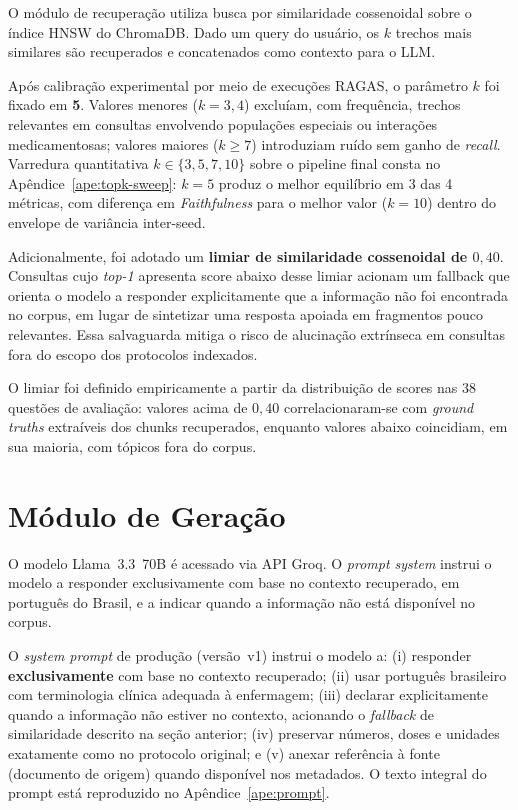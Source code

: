 \documentclass[
  12pt,
  oneside,
  a4paper,
  english,
  brazil
]{abntex2}
\begin{document}
O módulo de recuperação utiliza busca por similaridade cossenoidal sobre o índice
HNSW do ChromaDB. Dado um query do usuário, os $k$ trechos mais similares
são recuperados e concatenados como contexto para o LLM.

Após calibração experimental por meio de execuções RAGAS, o parâmetro $k$ foi
fixado em \textbf{5}. Valores menores ($k=3, 4$) excluíam, com frequência,
trechos relevantes em consultas envolvendo populações especiais ou interações
medicamentosas; valores maiores ($k \geq 7$) introduziam ruído sem ganho de
\textit{recall}. Varredura quantitativa $k \in \{3, 5, 7, 10\}$ sobre o
pipeline final consta no Apêndice~\ref{ape:topk-sweep}: $k=5$ produz o melhor
equilíbrio em 3 das 4 métricas, com diferença em \textit{Faithfulness} para o
melhor valor ($k=10$) dentro do envelope de variância inter-seed.

Adicionalmente, foi adotado um \textbf{limiar de similaridade cossenoidal de
$0{,}40$}. Consultas cujo \textit{top-1} apresenta score abaixo desse
limiar acionam um fallback que orienta o modelo a responder
explicitamente que a informação não foi encontrada no corpus, em lugar de
sintetizar uma resposta apoiada em fragmentos pouco relevantes. Essa salvaguarda
mitiga o risco de alucinação extrínseca em consultas fora do escopo dos
protocolos indexados.

O limiar foi definido empiricamente a partir da distribuição de scores
nas 38 questões de avaliação: valores acima de $0{,}40$ correlacionaram-se com
\textit{ground truths} extraíveis dos chunks recuperados, enquanto
valores abaixo coincidiam, em sua maioria, com tópicos fora do corpus.

\section{Módulo de Geração}

O modelo Llama~3.3~70B \cite{dubey2024} é acessado via API Groq. O \textit{prompt
system} instrui o modelo a responder exclusivamente com base no contexto recuperado,
em português do Brasil, e a indicar quando a informação não está disponível no
corpus.

O \textit{system prompt} de produção (versão~v1) instrui o modelo a: (i)
responder \textbf{exclusivamente} com base no contexto recuperado; (ii) usar
português brasileiro com terminologia clínica adequada à enfermagem; (iii)
declarar explicitamente quando a informação não estiver no contexto,
acionando o \textit{fallback} de similaridade descrito na seção anterior;
(iv) preservar números, doses e unidades exatamente como no protocolo
original; e (v) anexar referência à fonte (documento de origem) quando
disponível nos metadados. O texto integral do prompt está reproduzido
no Apêndice~\ref{ape:prompt}.
\end{document}
